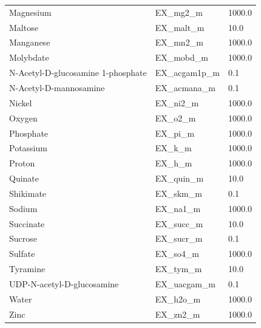 \begin{longtable}{lll}
		Magnesium & EX\_mg2\_m & 1000.0 \\
		Maltose & EX\_malt\_m & 10.0 \\
		Manganese & EX\_mn2\_m & 1000.0 \\
		Molybdate & EX\_mobd\_m & 1000.0 \\
		N-Acetyl-D-glucosamine 1-phosphate & EX\_acgam1p\_m & 0.1 \\
		N-Acetyl-D-mannosamine & EX\_acmana\_m & 0.1 \\
		Nickel & EX\_ni2\_m & 1000.0 \\
		Oxygen & EX\_o2\_m & 1000.0 \\
		Phosphate & EX\_pi\_m & 1000.0 \\
		Potassium & EX\_k\_m & 1000.0 \\
		Proton & EX\_h\_m & 1000.0 \\
		Quinate & EX\_quin\_m & 10.0 \\
		Shikimate & EX\_skm\_m & 0.1 \\
		Sodium & EX\_na1\_m & 1000.0 \\
		Succinate & EX\_succ\_m & 10.0 \\
		Sucrose & EX\_sucr\_m & 0.1 \\
		Sulfate & EX\_so4\_m & 1000.0 \\
		Tyramine & EX\_tym\_m & 10.0 \\
		UDP-N-acetyl-D-glucosamine & EX\_uacgam\_m & 0.1 \\
		Water & EX\_h2o\_m & 1000.0 \\
		Zinc & EX\_zn2\_m & 1000.0 \\
\end{longtable}
	
